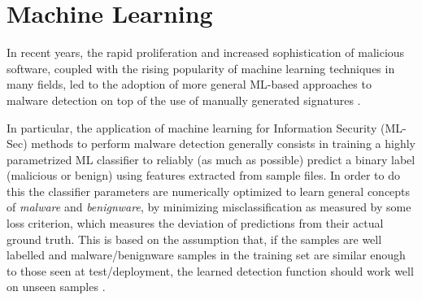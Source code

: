 \documentclass[pdfa%
,cucitura%
]{toptesi}
\begin{document}
\section{Machine Learning}\label{sec:previousMethods}
In recent years, the rapid proliferation and increased sophistication of malicious software, coupled with the rising popularity of machine learning techniques in many fields, led to the adoption of more general ML-based approaches to malware detection on top of the use of manually generated signatures \cite{DucauAMDATSE}.

In particular, the application of machine learning for Information Security (ML-Sec) methods to perform malware detection generally consists in training a highly parametrized ML classifier to reliably (as much as possible) predict a binary label (malicious or benign) using features extracted from sample files. In order to do this the classifier parameters are numerically optimized to learn general concepts of \textit{malware} and \textit{benignware}, by minimizing misclassification as measured by some loss criterion, which measures the deviation of predictions from their actual ground truth. This is based on the assumption that, if the samples are well labelled and malware/benignware samples in the training set are similar enough to those seen at test/deployment, the learned detection function should work well on unseen samples \cite{ruddALOHA}.
\end{document}
